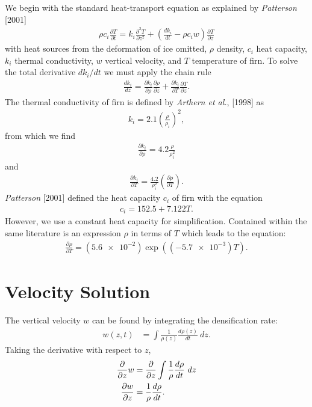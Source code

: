 \documentclass{article}%
\begin{document}
We begin with the standard heat-transport equation as explained by \emph{Patterson} [2001]
\begin{align}
  \rho c_i \frac{\partial T}{\partial t} = 
    k_i \frac{\partial^2 T}{\partial z^2} +
    \left( \frac{dk_i}{dt} - \rho c_i w \right) \frac{\partial T}{\partial z}
\end{align}
with heat sources from the deformation of ice omitted, $\rho$ density, $c_i$ heat capacity, $k_i$ thermal conductivity, $w$ vertical velocity, and $T$ temperature of firn.  To solve the total derivative $dk_i/dt$ we must apply the chain rule
\begin{align*}
  \frac{dk_i}{dz} = 
  \frac{\partial k_i}{\partial \rho} \frac{\partial \rho}{\partial z} + 
  \frac{\partial k_i}{\partial T} \frac{\partial T}{\partial z}.
\end{align*}
The thermal conductivity of firn is defined by \emph{Arthern et al.}, [1998] as
\begin{align}
  k_i = 2.1 \left(\frac{\rho}{\rho_i}\right)^2,
\end{align}
from which we find
\begin{align*}
  \frac{\partial k_i}{\partial \rho} = 
    4.2 \frac{\rho}{\rho_i^2}
\end{align*}
and
\begin{align*}
  \frac{\partial k_i}{\partial T} = 
    \frac{4.2}{\rho_i^2} \left( \frac{\partial \rho}{\partial T} \right).
\end{align*}
\emph{Patterson} [2001] defined the heat capacity $c_i$ of firn with the equation
\begin{align}
  c_i = 152.5 + 7.122 T.
\end{align}
However, we use a constant heat capacity for simplification.  Contained within the same literature is an expression $\rho$ in terms of $T$ which leads to the equation:
\begin{align}
  \frac{\partial \rho}{\partial T} = 
    (\SI{5.6e-2}) \exp ((\SI{-5.7e-3})T).
\end{align}



\section{Velocity Solution}

The vertical velocity $w$ can be found by integrating the densification rate:
\begin{align*}
  w(z,t) &= \int \frac{1}{\rho(z)} \frac{d\rho(z)}{dt}\ dz.
\end{align*}
Taking the derivative with respect to $z$,
\begin{align}
  \frac{\partial}{\partial z} w &= \frac{\partial}{\partial z} \int \frac{1}{\rho} \frac{d\rho}{dt}\ dz \notag \\
  \frac{\partial w}{\partial z} &= \frac{1}{\rho} \frac{d\rho}{dt}.
\end{align}
\end{document}
